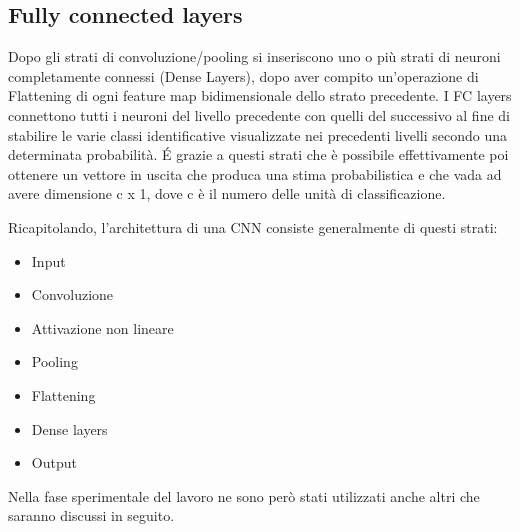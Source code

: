 \subsection{Fully connected layers}
Dopo gli strati di convoluzione/pooling si inseriscono uno o più strati di neuroni completamente connessi (Dense Layers), 
dopo aver compito un'operazione di Flattening di ogni feature map bidimensionale dello strato precedente.
I FC layers connettono tutti i neuroni del livello precedente con quelli del successivo al fine di stabilire 
le varie classi identificative visualizzate nei precedenti livelli secondo una determinata probabilità.
É grazie a questi strati che è possibile effettivamente poi ottenere un vettore in uscita
 che produca una stima probabilistica e che vada 
ad avere dimensione c x 1, dove c è il numero delle unità di classificazione. 

Ricapitolando, l’architettura di una CNN consiste generalmente di questi strati: 
\begin{itemize}
\item Input
\item Convoluzione 
\item Attivazione non lineare
\item Pooling 
\item Flattening
\item Dense layers
\item Output
\end{itemize}
Nella fase sperimentale del lavoro ne sono però stati utilizzati anche altri che saranno discussi in seguito.



